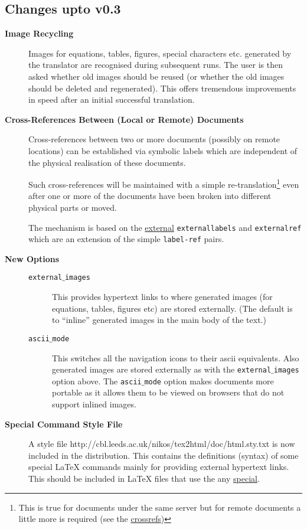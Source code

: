 \subsection{Changes upto v0.3}
\begin{description}
\item [{\bf Image Recycling}]
Images for equations, tables, figures, special characters etc. generated by
the translator are recognised  during subsequent runs.
The user is then asked whether old images should be reused
(or whether the old images should be deleted and regenerated).
This offers tremendous improvements in speed after an initial
successful translation.

\item [{\bf Cross-References Between (Local or Remote) Documents}]
Cross-references between 
two or more documents (possibly on remote locations) can be
established via symbolic labels
which are independent of the physical realisation of these documents. 

Such cross-references will be maintained with a simple
re-translation\footnote{This is true for documents under the same
server but for remote documents a little more is required (see 
the \hyperref{example}{example in Section}{}{crossrefs})}
even after one or more of the documents have been broken into
different physical parts or moved.

The mechanism is based on the 
\hyperref{new commands}{new commands (see Section }{ )}{external}
{\tt externallabels} and {\tt externalref} which are an extension of the simple 
{\tt label-ref} pairs. 

\item [{\bf New Options}] \hfill
\begin{description}
\item [{\tt external$\_$images}] This provides hypertext links to where
generated images (for equations, tables, figures etc) are stored
externally. (The default is to ``inline'' generated images in the main body 
of the text.)
\item [{\tt ascii$\_$mode}] This switches all the navigation icons to their
ascii equivalents. Also generated images are stored externally as with the 
{\tt external$\_$images} option above. The {\tt ascii$\_$mode} option
makes documents more portable as it allows them to be
viewed on browsers that do not support inlined images.
\end{description}
\item [{\bf Special Command Style File}] A style file  
{http://cbl.leeds.ac.uk/nikos/tex2html/doc/html.sty.txt} is now included in the
distribution. This contains the definitions (syntax) of some 
special LaTeX commands mainly for providing external hypertext
links.
This should be included in LaTeX files that use the any 
\hyperref{hypermedia extensions}{hypermedia extensions (see Section}{ )}{special}.


\end{description}
